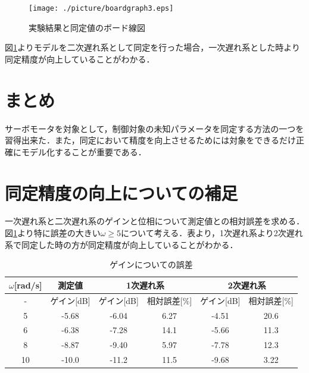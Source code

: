 \documentclass{jsarticle}
\begin{document}
\newpage
\thispagestyle{fancy}

\begin{figure}[htbp]
 \begin{center}
  \texttt{[image: ./picture/boardgraph3.eps]}
  \caption{実験結果と同定値のボード線図}
  \label{fig:board3}
 \end{center}
\end{figure}

図\ref{fig:board3}よりモデルを二次遅れ系として同定を行った場合，一次遅れ系とした時より同定精度が向上していることがわかる．


\section{まとめ}
サーボモータを対象として，制御対象の未知パラメータを同定する方法の一つを習得出来た．また，同定において精度を向上させるためには対象をできるだけ正確にモデル化することが重要である．
 
\newpage

\thispagestyle{fancy}



\section{同定精度の向上についての補足}
一次遅れ系と二次遅れ系のゲインと位相について測定値との相対誤差を求める．図\ref{fig:board3}より特に誤差の大きい$\omega \geq 5$について考える．表より，1次遅れ系より2次遅れ系で同定した時の方が同定精度が向上していることがわかる．

\begin{table}[hb]
 \begin{center}
  \caption{ゲインについての誤差}
  \begin{tabular}{|c||c||c|c||c|c|} \hline
   \multicolumn{1}{|c||}{$\omega$[rad/s]}
   & \multicolumn{1}{c||}{測定値}
       & \multicolumn{2}{|c||}{1次遅れ系}
   & \multicolumn{2}{|c|}{2次遅れ系} \\ \hline \hline
   - & ゲイン[dB] & ゲイン[dB] &  相対誤差[\%] & ゲイン[dB] & 相対誤差[\%] \\ \hline \hline
   5  & -5.68 & -6.04 & 6.27 & -4.51 & 20.6 \\ \hline
   6  & -6.38 & -7.28 & 14.1 & -5.66 & 11.3 \\ \hline
   8  & -8.87 & -9.40 & 5.97 & -7.78 & 12.3 \\ \hline
   10 & -10.0 & -11.2 & 11.5 & -9.68 & 3.22\\ \hline
  \end{tabular}
 \end{center}
\end{table}
\end{document}
